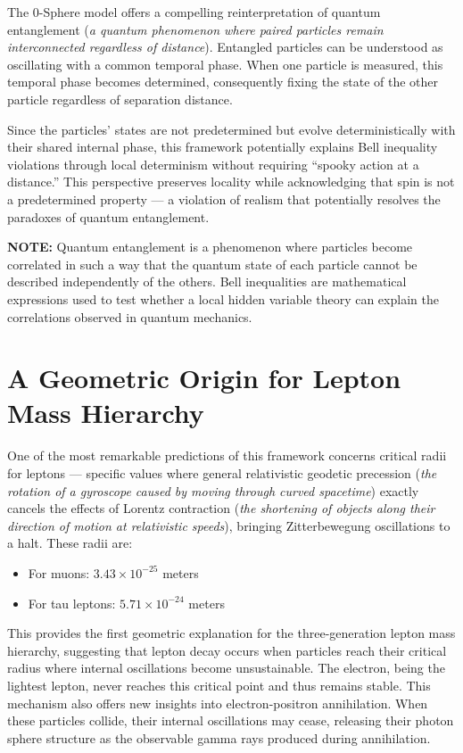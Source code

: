 \documentclass[12pt,letterpaper]{article} %
\begin{document}
The 0-Sphere model offers a compelling reinterpretation of quantum entanglement (\textit{a quantum phenomenon where paired particles remain interconnected regardless of distance}). Entangled particles can be understood as oscillating with a common temporal phase. When one particle is measured, this temporal phase becomes determined, consequently fixing the state of the other particle regardless of separation distance\cite{einstein1935}.

Since the particles' states are not predetermined but evolve deterministically with their shared internal phase, this framework potentially explains Bell inequality violations through local determinism without requiring ``spooky action at a distance.'' This perspective preserves locality while acknowledging that spin is not a predetermined property --- a violation of realism that potentially resolves the paradoxes of quantum entanglement.

\vspace{0.5cm}
\noindent\textbf{NOTE:} Quantum entanglement is a phenomenon where particles become correlated in such a way that the quantum state of each particle cannot be described independently of the others. Bell inequalities are mathematical expressions used to test whether a local hidden variable theory can explain the correlations observed in quantum mechanics.

\section{A Geometric Origin for Lepton Mass Hierarchy}
One of the most remarkable predictions of this framework concerns critical radii for leptons --- specific values where general relativistic geodetic precession (\textit{the rotation of a gyroscope caused by moving through curved spacetime})\cite{hartle2021} exactly cancels the effects of Lorentz contraction (\textit{the shortening of objects along their direction of motion at relativistic speeds}), bringing Zitterbewegung oscillations to a halt. These radii are:
\begin{itemize}
\item For muons: $3.43 \times 10^{-25}$ meters
\item For tau leptons: $5.71 \times 10^{-24}$ meters
\end{itemize}
This provides the first geometric explanation for the three-generation lepton mass hierarchy, suggesting that lepton decay occurs when particles reach their critical radius where internal oscillations become unsustainable. The electron, being the lightest lepton, never reaches this critical point and thus remains stable.
This mechanism also offers new insights into electron-positron annihilation\cite{hanamura2021}. When these particles collide, their internal oscillations may cease, releasing their photon sphere structure as the observable gamma rays produced during annihilation.
\end{document}
